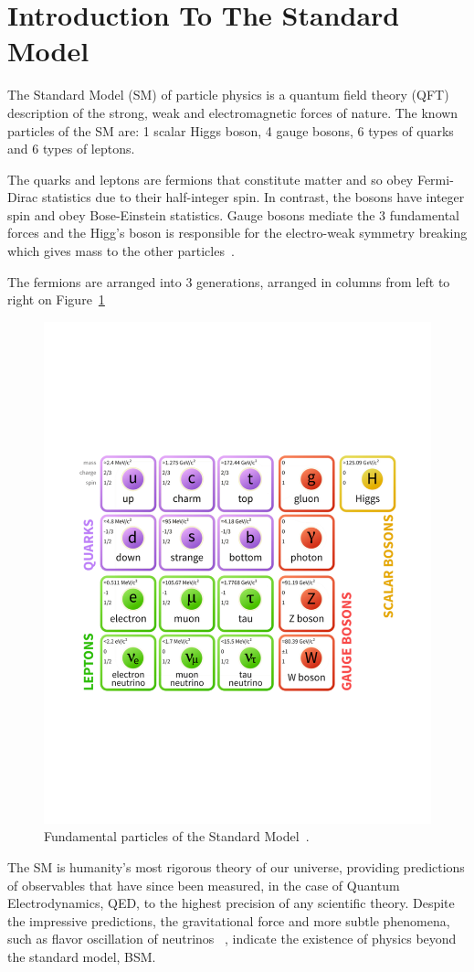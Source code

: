 \section{Introduction To The Standard Model}\label{secSM}



The Standard Model (SM) of particle physics is a quantum field theory (QFT) description of the strong, weak and electromagnetic forces of nature. The known particles of the SM are: 1 scalar Higgs boson, 4 gauge bosons, 6 types of quarks and 6 types of leptons. 

The quarks and leptons are fermions that constitute matter and so obey Fermi-Dirac statistics due to their half-integer spin. In contrast, the bosons have integer spin and obey Bose-Einstein statistics. Gauge bosons mediate the 3 fundamental forces and the Higg's boson is responsible for the electro-weak symmetry breaking which gives mass to the other particles~\cite{Griffiths:111880}. 

The fermions are arranged into 3 generations, arranged in columns from left to right on Figure~\ref{fig:SM}

\begin{figure}[htb]
\centering
\includegraphics[width=.60\textwidth]{smdiagram.pdf}
\caption{Fundamental particles of the Standard Model~\cite{modellinginvisible}.}
\label{fig:SM}
\end{figure}




The SM is humanity's most rigorous theory of our universe, providing predictions of observables that have since been measured, in the case of Quantum Electrodynamics, QED, to the highest precision of any scientific theory. Despite the impressive predictions, the gravitational force and more subtle phenomena, such as flavor oscillation of neutrinos ~\cite{Ashie:2005ik}, indicate the existence of physics beyond the standard model, BSM.


